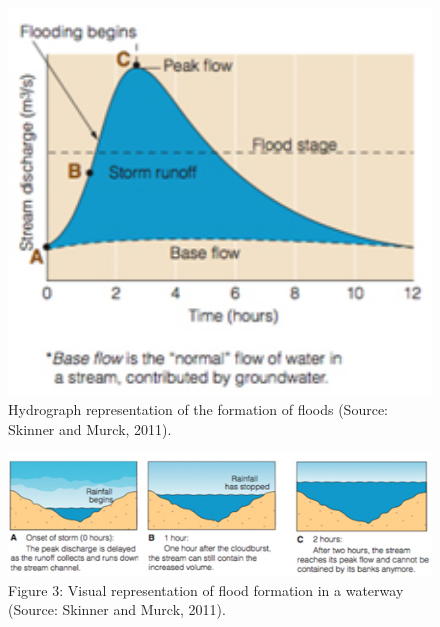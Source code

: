 \begin{figure}[htb]
	\centering
		\includegraphics[width=1.00\textwidth]{graphics/base_flow.jpg}
	\caption{Hydrograph representation of the formation of floods (Source: Skinner and Murck, 2011).}
	\label{fig:base_flow}
\end{figure}
 
\begin{figure}[htbp]
	\centering
		\includegraphics[width=1.00\textwidth]{graphics/hydrograph.jpg}
	\caption{Figure 3: Visual representation of flood formation in a waterway (Source: Skinner and Murck, 2011).}
	\label{fig:hydrograph}
\end{figure}
  

